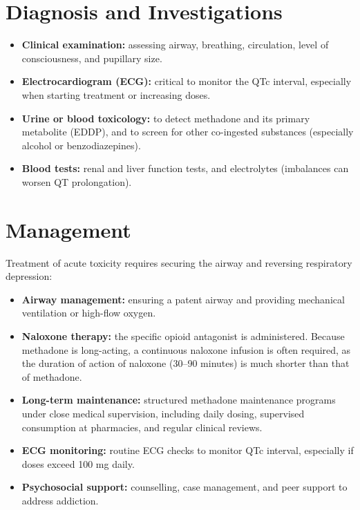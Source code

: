 \section*{Diagnosis and Investigations}
\begin{itemize}
    \item \textbf{Clinical examination:} assessing airway, breathing, circulation, level of consciousness, and pupillary size.
    \item \textbf{Electrocardiogram (ECG):} critical to monitor the QTc interval, especially when starting treatment or increasing doses.
    \item \textbf{Urine or blood toxicology:} to detect methadone and its primary metabolite (EDDP), and to screen for other co-ingested substances (especially alcohol or benzodiazepines).
    \item \textbf{Blood tests:} renal and liver function tests, and electrolytes (imbalances can worsen QT prolongation).
\end{itemize}

\section*{Management}
Treatment of acute toxicity requires securing the airway and reversing respiratory depression:

\begin{itemize}
    \item \textbf{Airway management:} ensuring a patent airway and providing mechanical ventilation or high-flow oxygen.
    \item \textbf{Naloxone therapy:} the specific opioid antagonist is administered. Because methadone is long-acting, a continuous naloxone infusion is often required, as the duration of action of naloxone (30--90 minutes) is much shorter than that of methadone.
    \item \textbf{Long-term maintenance:} structured methadone maintenance programs under close medical supervision, including daily dosing, supervised consumption at pharmacies, and regular clinical reviews.
    \item \textbf{ECG monitoring:} routine ECG checks to monitor QTc interval, especially if doses exceed 100 mg daily.
    \item \textbf{Psychosocial support:} counselling, case management, and peer support to address addiction.
\end{itemize}

